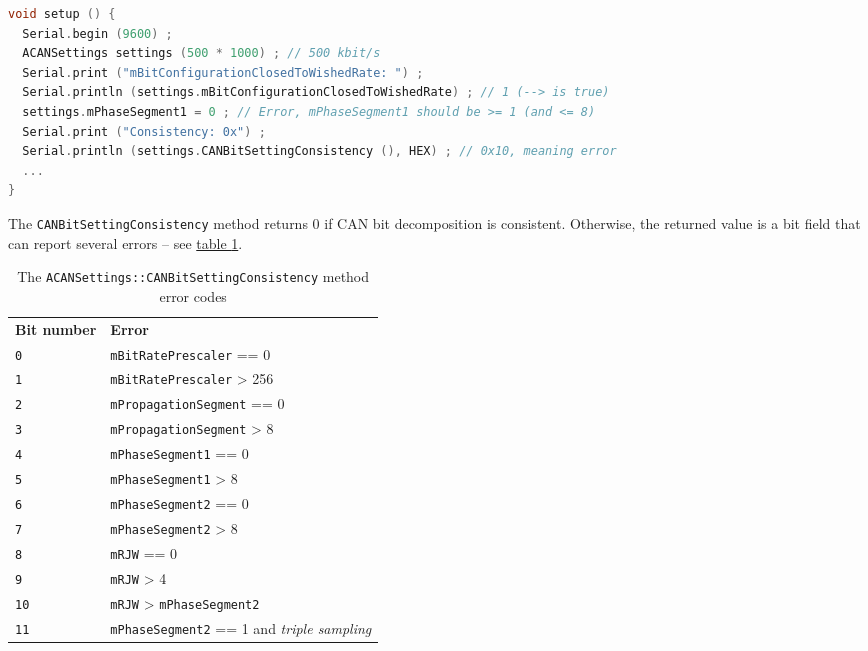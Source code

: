 \documentclass[10pt, a4paper, obeyspaces, openany]{extarticle}
\newcommand\labelTableau[1]{\label{tab:#1}}
\newcommand\refTableau[1]{\hyperref[tab:#1]{table \ref*{tab:#1}}}
\begin{document}
{ \small\begin{lstlisting}[language=c++]
void setup () {
  Serial.begin (9600) ;
  ACANSettings settings (500 * 1000) ; // 500 kbit/s
  Serial.print ("mBitConfigurationClosedToWishedRate: ") ;
  Serial.println (settings.mBitConfigurationClosedToWishedRate) ; // 1 (--> is true)
  settings.mPhaseSegment1 = 0 ; // Error, mPhaseSegment1 should be >= 1 (and <= 8)
  Serial.print ("Consistency: 0x") ;
  Serial.println (settings.CANBitSettingConsistency (), HEX) ; // 0x10, meaning error
  ...
}
\end{lstlisting}}

The \texttt{CANBitSettingConsistency} method returns $0$ if CAN bit decomposition is consistent. Otherwise, the returned value is a bit field that can report several errors -- see \refTableau{CANBitSettingConsistencyErrorCode}.

\begin{table}[!ht]
  \newcommand\zero{\texttt{0}}
  \newcommand\X{\texttt{x}}
  \small
  \onehalfspacing
  \centering
  \begin{tabular}{ll}
    \textbf{Bit number} & \textbf{Error}\\
    \texttt{0} & \texttt{mBitRatePrescaler} == 0\\
    \texttt{1} & \texttt{mBitRatePrescaler} > 256\\
    \texttt{2} & \texttt{mPropagationSegment} == 0\\
    \texttt{3} & \texttt{mPropagationSegment} > 8\\
    \texttt{4} & \texttt{mPhaseSegment1} == 0\\
    \texttt{5} & \texttt{mPhaseSegment1} > 8\\
    \texttt{6} & \texttt{mPhaseSegment2} == 0\\
    \texttt{7} & \texttt{mPhaseSegment2} > 8\\
    \texttt{8} & \texttt{mRJW} == 0\\
    \texttt{9} & \texttt{mRJW} > 4\\
    \texttt{10} & \texttt{mRJW} > \texttt{mPhaseSegment2}\\
    \texttt{11} & \texttt{mPhaseSegment2} == 1 and \emph{triple sampling}\\
  \end{tabular}
  \caption{The \texttt{ACANSettings::CANBitSettingConsistency} method error codes}
  \labelTableau{CANBitSettingConsistencyErrorCode}
\end{table}
\end{document}

